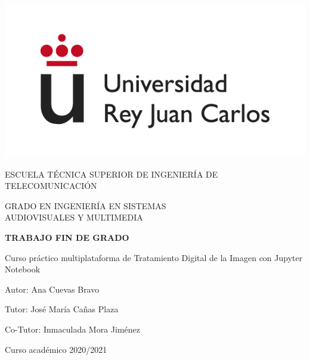 \begin{titlepage}
	\begin{center}
		\vspace*{3mm}
		\begin{center}
			\includegraphics[width=0.4\linewidth]{imagenes/logo.jpg}
		\end{center}
		\vspace{6.0mm}
		
		\fontsize{15.5}{14}\selectfont ESCUELA TÉCNICA SUPERIOR DE INGENIERÍA DE TELECOMUNICACIÓN
		\vspace{13mm}
		
		\fontsize{14}{14}\selectfont GRADO EN INGENIERÍA EN SISTEMAS \\ AUDIOVISUALES Y MULTIMEDIA
		
		\vspace{70pt}
		
		\fontsize{15.7}{14}\selectfont \textbf{TRABAJO FIN DE GRADO} 
		
		\vspace{20mm}
		\begin{huge}
			Curso práctico multiplataforma de Tratamiento Digital de la Imagen con Jupyter Notebook
		\end{huge}
		
		\vspace{20mm}
		
		\begin{large}
			Autor: Ana Cuevas Bravo
			
			Tutor: José María Cañas Plaza
			
			Co-Tutor: Inmaculada Mora Jiménez
			
			\vspace{10mm}
		\end{large}
		\begin{normalsize}
			Curso académico 2020/2021		
		\end{normalsize}
		\vspace{10mm}
		
	\end{center}
	
\end{titlepage}